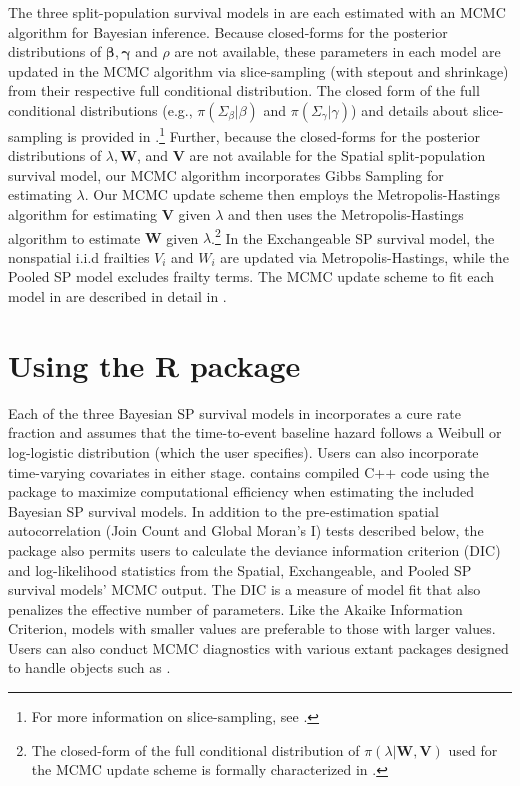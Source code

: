 The three split-population survival models in  are each
estimated with an MCMC algorithm for Bayesian inference. Because closed-forms
for the posterior distributions of $\boldsymbol{\beta,\gamma}$ and $\rho$ are
not available, these parameters in each model are updated in the MCMC algorithm
via slice-sampling (with stepout and shrinkage) from their respective full
conditional distribution. The closed form
of the full conditional distributions (e.g., $\pi\left(\Sigma_{\beta}|{\beta}\right)$ and
$\pi\left(\Sigma_{\gamma}|{\gamma}\right)$) and details about slice-sampling
is provided in \citet{Bolte2021}.\footnote{For more information on slice-sampling, see \citet{neal2003slice}.} Further, because the closed-forms for the posterior distributions of
$\lambda,\mathbf{W}$, and $\mathbf{V}$ are not available for the Spatial split-population
survival model, our MCMC algorithm incorporates Gibbs Sampling for
estimating $\lambda$. Our MCMC update scheme then employs the Metropolis-Hastings algorithm for estimating $\mathbf{V}$ given $\lambda$ and then uses the Metropolis-Hastings algorithm to estimate $\mathbf{W}$ given $\lambda$.\footnote{The closed-form of the
full conditional distribution of $\pi(\lambda|\mathbf{W},\mathbf{V})$ used for
the MCMC update scheme is formally characterized in \citet{Bolte2021}.} In the Exchangeable SP
survival model, the nonspatial i.i.d frailties $V_{i}$ and $W_{i}$  are
updated via Metropolis-Hastings, while the Pooled SP model excludes
frailty terms. The MCMC update scheme to fit each model in  are
described in detail in \citet{Bolte2021}.



\section{Using the  R package}

Each of the three Bayesian SP survival models in  incorporates a cure rate fraction and assumes that the time-to-event baseline hazard follows a Weibull or log-logistic distribution (which the user specifies). Users can also incorporate time-varying covariates in either stage.  contains compiled C++ code using the package  \citep{Rcpp-pkg} to maximize computational efficiency when estimating the included Bayesian SP survival models. In addition to the pre-estimation spatial autocorrelation (Join Count and
Global Moran's I) tests described below, the  package also permits users to calculate the deviance information criterion (DIC) and log-likelihood statistics from the Spatial, Exchangeable, and Pooled SP survival models' MCMC output. The DIC is a measure of model fit that also penalizes the effective number of parameters. Like the Akaike Information Criterion, models with smaller values are preferable to those with larger values. Users can also conduct MCMC diagnostics with various extant packages designed to handle  objects such as  \citep{coda-manual}.



